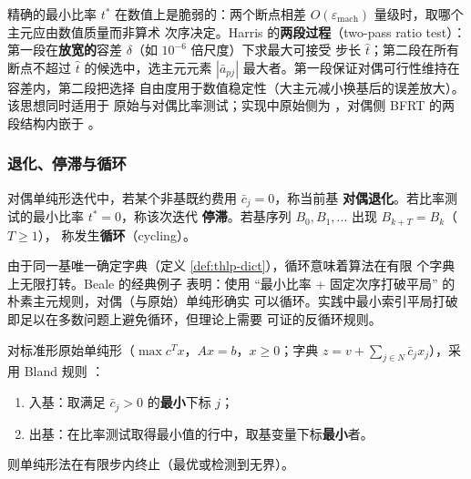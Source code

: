\begin{remark}\label{rem:thlp-harris}
精确的最小比率 $t^{*}$ 在数值上是脆弱的：两个断点相差
$O(\varepsilon_{\mathrm{mach}})$ 量级时，取哪个主元应由数值质量而非算术
次序决定。Harris 的\textbf{两段过程}（two-pass ratio test）\cite{lpharris1973}：
第一段在\textbf{放宽的}容差 $\delta$（如 $10^{-6}$ 倍尺度）下求最大可接受
步长 $\hat t$；第二段在所有断点不超过 $\hat t$ 的候选中，选主元元素
$|\bar a_{pj}|$ 最大者。第一段保证对偶可行性维持在容差内，第二段把选择
自由度用于数值稳定性（大主元减小换基后的误差放大）。该思想同时适用于
原始与对偶比率测试；实现中原始侧为
，对偶侧 BFRT 的两段结构内嵌于
。
\end{remark}

\subsubsection{退化、停滞与循环}\label{subsubsec:thlp-cycling}

\begin{definition}[对偶退化与循环]\label{def:thlp-cycling}
对偶单纯形迭代中，若某个非基既约费用 $\bar c_j=0$，称当前基
\textbf{对偶退化}。若比率测试的最小比率 $t^{*}=0$，称该次迭代
\textbf{停滞}。若基序列 $B_0,B_1,\dots$ 出现 $B_{k+T}=B_k$（$T\ge1$），
称发生\textbf{循环}（cycling）。
\end{definition}

由于同一基唯一确定字典（定义 \ref{def:thlp-dict}），循环意味着算法在有限
个字典上无限打转。Beale 的经典例子 \cite{lpbeale1955} 表明：使用
``最小比率 + 固定次序打破平局'' 的朴素主元规则，对偶（与原始）单纯形确实
可以循环。实践中最小索引平局打破即足以在多数问题上避免循环，但理论上需要
可证的反循环规则。

\begin{theorem}\label{thm:thlp-bland}
对标准形原始单纯形（$\max c^{T}x$，$Ax=b$，$x\ge0$；字典
$z=v+\sum_{j\in N}\bar c_j x_j$），采用 Bland 规则
\cite{lpbland1977}：
\begin{enumerate}
  \item 入基：取满足 $\bar c_j>0$ 的\textbf{最小}下标 $j$；
  \item 出基：在比率测试取得最小值的行中，取基变量下标\textbf{最小}者。
\end{enumerate}
则单纯形法在有限步内终止（最优或检测到无界）。
\end{theorem}

